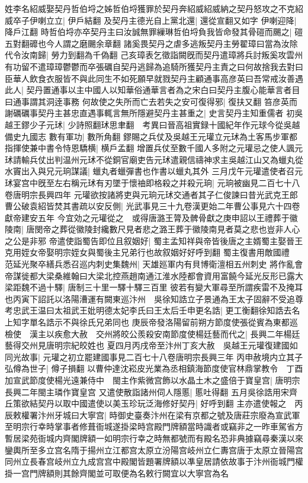 姓李名紹威娶契丹哲伯埒之姊哲伯埒獲罪於契丹奔紹威紹威納之契丹怒攻之不克紹威卒子伊喇立立|{
	伊戶結翻}
及契丹主德光自上黨北還|{
	還從宣翻又如字}
伊喇迎降|{
	降戶江翻}
時哲伯埒亦卒契丹主曰汝誠無罪繅琳哲伯埒負我皆命發其骨磑而颺之|{
	磑五對翻䃺也今人謂之磨颺余章翻}
諸奚畏契丹之虐多逃叛契丹主勞翟璋曰當為汝除代令汝南歸|{
	勞力到翻為千偽翻}
己亥璋表乞徵詣闕旣而契丹遣璋將兵討叛奚攻雲州有功留不遣璋璋鬱鬱而卒張礪自契丹逃歸為追騎所獲契丹主責之曰何故捨我去對曰臣華人飲食衣服皆不與此同生不如死願早就戮契丹主顧通事高彦英曰吾常戒汝善遇此人|{
	契丹置通事以主中國人以知華俗通華言者為之宋白曰契丹主腹心能華言者目曰通事謂其洞逹事務}
何故使之失所而亡去若失之安可復得邪|{
	復扶又翻}
笞彦英而謝礪礪事契丹主甚忠直遇事輒言無所隱避契丹主甚重之|{
	史言契丹主知重儒者}
初吳越王鏐少子元㺷|{
	少詩照翻㺷思聿翻　考異曰晉高祖實録十國紀年作元球今從吳越備史九國志}
數有軍功|{
	數所角翻}
鏐賜之兵仗及吳越王元瓘立元㺷為土客馬步軍都指揮使兼中書令恃恩驕横|{
	横戶孟翻}
增置兵仗至數千國人多附之元瓘忌之使人諷元㺷請輸兵仗出判温州元㺷不從銅官廟吏告元㺷遣親信禱神求主吳越江山又為蠟丸從水竇出入與兄元珦謀議|{
	蠟丸者蠟彈書也作書以蠟丸其外}
三月戊午元瓘遣使者召元㺷宴宫中旣至左右稱元㺷有刃墜于懷䄂即格殺之并殺元珦|{
	元珦被幽見二百七十八卷唐明宗長興四年}
元瓘欲按諸將吏與元珦元㺷交通者其子仁俊諫曰昔光武克王郎曹公破袁紹皆焚其書疏以安反側|{
	光武事見三十九卷漢更始二年曹公事見六十四卷獻帝建安五年}
今宜効之元瓘從之　或得唐潞王膂及髀骨獻之庚申詔以王禮葬于徽陵南|{
	唐閔帝之葬從徽陵封纔數尺見者悲之潞王葬于徽陵南見者莫之悲也豈非人心之公是非邪}
帝遣使詣蜀告即位且叙姻好|{
	蜀主孟知祥與帝皆後唐之主婿蜀主娶晉王克用姪女帝娶明宗姪女與蜀後主兄弟行也故叙姻好好呼到翻}
蜀主復書用敵國禮　范延光聚卒繕兵悉召巡内刺史集魏州|{
	天雄廵軍内有貝博衛澶相五州刺史}
將作亂會帝謀徙都大梁桑維翰曰大梁北控燕趙南通江淮水陸都會資用富饒今延光反形已露大梁距魏不過十驛|{
	唐制三十里一驛十驛三百里}
彼若有變大軍尋至所謂疾雷不及掩耳也丙寅下詔託以洛陽漕運有闕東巡汴州　吳徐知誥立子景通為王太子固辭不受追尊考忠武王温曰太祖武王妣明德太妃李氏曰王太后壬申更名誥|{
	更工衡翻徐知誥去名上知字單名誥示不與徐氏兄弟同也}
庚辰帝發洛陽留前朔方節度使張從賓為東都巡檢使　漢主以疾愈大赦　交州將皎公羨殺安南節度使楊廷藝而代之|{
	長興二年楊廷藝得交州見唐明宗紀皎姓也}
夏四月丙戌帝至汴州丁亥大赦　吳越王元瓘復建國如同光故事|{
	元瓘之初立罷建國事見二百七十八卷唐明宗長興三年}
丙申赦境内立其子弘僔為世子|{
	僔子損翻}
以曹仲達沈崧皮光業為丞相鎮海節度使官林鼎掌教令　丁酉加宣武節度使楊光遠兼侍中　閩主作紫微宫飾以水晶土木之盛倍于寶皇宫|{
	唐明宗長興二年閩主璘作寶皇宫}
又遣使散詣諸州伺人隱慝|{
	慝吐得翻}
五月吳徐誥用宋齊丘策欲結契丹以取中國遣使以美玉珍玩泛海修好契丹|{
	好呼到翻}
主亦遣使報之　丙辰敕權署汴州牙城曰大寧宫|{
	時御史臺奏汴州在梁有京都之號及唐莊宗廢為宣武軍至明宗行幸時掌事者修葺衙城遂掛梁時宫殿門牌額當時識者或竊非之一昨車駕省方暫居梁苑衙城内齊閣牌額一如明宗行幸之時無都號而有殿名恐非典據竊尋秦漢以來鑾輿所至多立宫名隋于揚州立江都宫太原立汾陽宫岐州立仁夀宫唐于太原立晉陽宫同州立長春宫岐州立九成宫宫中殿閣皆題署牌額以凖皇居請依故事于汴州衙城門權掛一宫門牌額則其餘齊閣並可取便為名敕行闕宜以大寧宫為名}

